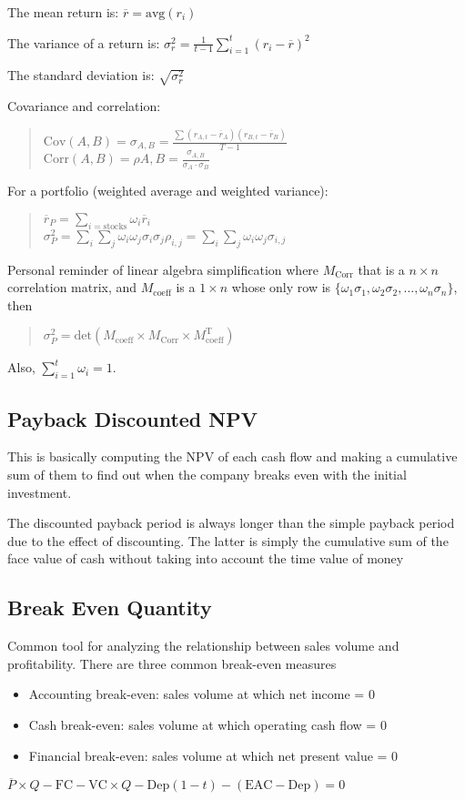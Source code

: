 The mean return is: $\overline{r}=\text{avg}(r_i)$

The variance of a return is: $\sigma_r^2 = \frac{1}{t-1}\sum_{i=1}^{t}(r_i-\overline{r})^2$

The standard deviation is: $\sqrt{\sigma_r^2}$

Covariance and correlation:

\blockquote{
  $\mathrm{Cov}(A,B) = \sigma_{A,B} = \frac{\sum(r_{A,t}-\overline{r}_A)(r_{B,t}-\overline{r}_B)}{T-1}$ \\
  $\mathrm{Corr}(A,B) = \rho{A,B} = \frac{\sigma_{A,B}}{\sigma_A\cdot\sigma_B}$
}

For a portfolio (weighted average and weighted variance):
\blockquote{
  $\overline{r}_P=\sum_{i=\text{stocks}}\omega_i\overline{r}_i$ \\
  $\sigma_P^2=\sum_{i}\sum_{j}\omega_i\omega_j\sigma_i\sigma_j\rho_{i,j}=\sum_{i}\sum_{j}\omega_i\omega_j\sigma_{i,j}$
}

Personal reminder of linear algebra simplification where
$M_{\mathrm{Corr}}$ that is a $n\times n$ correlation matrix, and
$M_{\mathrm{coeff}}$ is a $1\times n$ whose only row is $
\{\omega_1\sigma_1, \omega_2\sigma_2, \dots, \omega_n\sigma_n\}$, then

\blockquote{
  $\sigma_P^2 = \mathrm{det}\left(M_{\mathrm{coeff}}\times M_{\mathrm{Corr}}\times M_{\mathrm{coeff}}^{\mathrm{T}}\right)$
}

Also, $\sum_{i=1}^{t}\omega_i = 1$.

\subsection{Payback Discounted NPV}
This is basically computing the NPV of each cash flow and making a
cumulative sum of them to find out when the company breaks even with the
initial investment.

The discounted payback period is always longer than the simple payback
period due to the effect of discounting. The latter is simply the
cumulative sum of the face value of cash without taking into account the
time value of money

\subsection{Break Even Quantity}
Common tool for analyzing the relationship between sales volume and
profitability. There are three common break-even measures
\begin{itemize}
  \item Accounting break-even: sales volume at which net income = 0
  \item Cash break-even: sales volume at which operating cash flow = 0
  \item Financial break-even: sales volume at which net present value = 0
\end{itemize}
$\overline{P}\times Q-\mathrm{FC}-\mathrm{VC}\times Q-\text{Dep}(1-t)-(\mathrm{EAC}-\text{Dep}) = 0$

